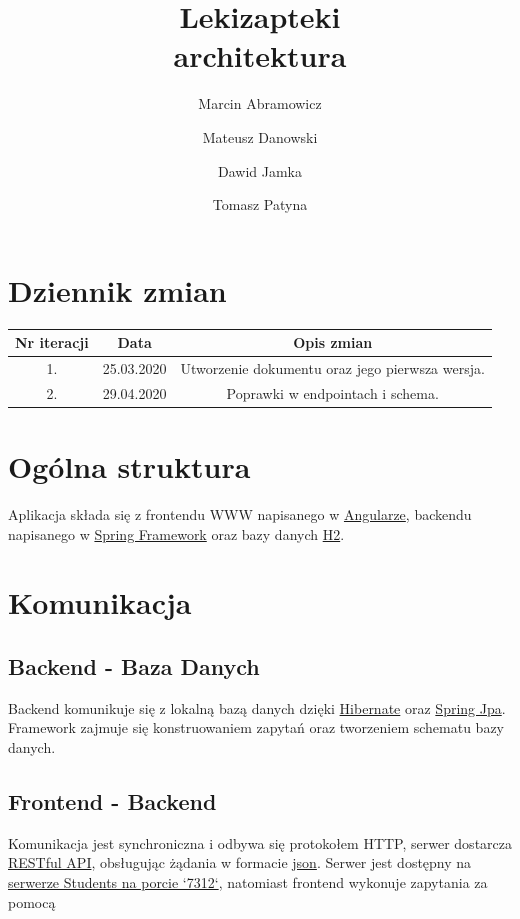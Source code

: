 \documentclass{article}
\title{
Lekizapteki\\
\large architektura}
\author{Marcin Abramowicz \and Mateusz Danowski \and Dawid Jamka \and Tomasz Patyna}
\begin{document}
  \maketitle

  \section{Dziennik zmian}
    \begin{tabular}{|c|c|c|}
      Nr iteracji & Data & Opis zmian \\
      \hline
      1. & 25.03.2020 & Utworzenie dokumentu oraz jego pierwsza wersja. \\
      \hline
      2. & 29.04.2020 & Poprawki w endpointach i schema. \\
    \end{tabular}

  \section{Ogólna struktura}
    Aplikacja składa się z frontendu WWW napisanego w
    \href{https://angular.io}{Angularze}, backendu napisanego w
    \href{https://spring.io}{Spring Framework} oraz bazy danych
    \href {https://www.h2database.com/html/main.html}{H2}.

  \section{Komunikacja}
    \subsection{Backend - Baza Danych}
    Backend komunikuje się z lokalną bazą danych dzięki
    \href{https://hibernate.org}{Hibernate} oraz
    \href{https://spring.io/projects/spring-data-jpa} {Spring Jpa}.
    Framework zajmuje się konstruowaniem zapytań oraz tworzeniem schematu bazy danych.

    \subsection{Frontend - Backend}
    Komunikacja jest synchroniczna i odbywa się protokołem HTTP, serwer dostarcza
    \href{https://en.wikipedia.org/wiki/Representational_state_transfer}{RESTful API},
    obsługując żądania w formacie
    \href{https://en.wikipedia.org/wiki/JSON}{json}.
    Serwer jest dostępny na
    \href{http://students.mimuw.edu.pl:7312}{serwerze Students na porcie `7312`},
    natomiast frontend wykonuje zapytania za pomocą
\end{document}
